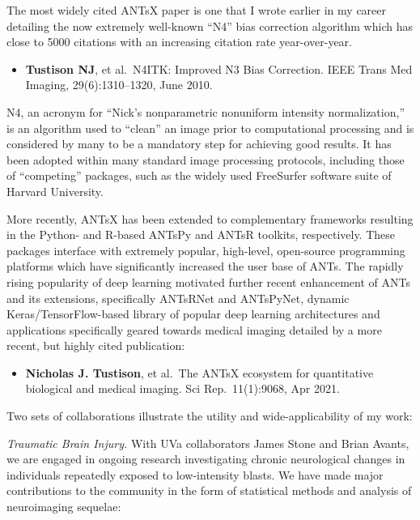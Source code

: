 \documentclass[
  11pt,
]{article}
\providecommand{\tightlist}{%
  \setlength{\itemsep}{0pt}\setlength{\parskip}{0pt}}
\begin{document}
The most widely cited ANTsX paper is one that I wrote earlier in my
career detailing the now extremely well-known ``N4'' bias correction
algorithm which has close to 5000 citations with an increasing citation
rate year-over-year.

\begin{itemize}
\tightlist
\item
  \textbf{Tustison NJ}, et al.~N4ITK: Improved N3 Bias Correction. IEEE
  Trans Med Imaging, 29(6):1310--1320, June 2010.
\end{itemize}

N4, an acronym for ``Nick's nonparametric nonuniform intensity
normalization,'' is an algorithm used to ``clean'' an image prior to
computational processing and is considered by many to be a mandatory
step for achieving good results. It has been adopted within many
standard image processing protocols, including those of ``competing''
packages, such as the widely used FreeSurfer software suite of Harvard
University.

More recently, ANTsX has been extended to complementary frameworks
resulting in the Python- and R-based ANTsPy and ANTsR toolkits,
respectively. These packages interface with extremely popular,
high-level, open-source programming platforms which have significantly
increased the user base of ANTs. The rapidly rising popularity of deep
learning motivated further recent enhancement of ANTs and its
extensions, specifically ANTsRNet and ANTsPyNet, dynamic
Keras/TensorFlow-based library of popular deep learning architectures
and applications specifically geared towards medical imaging detailed by
a more recent, but highly cited publication:

\begin{itemize}
\tightlist
\item
  \textbf{Nicholas J. Tustison}, et al.~The ANTsX ecosystem for
  quantitative biological and medical imaging. Sci Rep.~11(1):9068, Apr
  2021.
\end{itemize}

Two sets of collaborations illustrate the utility and wide-applicability
of my work:

\emph{Traumatic Brain Injury.} With UVa collaborators James Stone and
Brian Avants, we are engaged in ongoing research investigating chronic
neurological changes in individuals repeatedly exposed to low-intensity
blasts. We have made major contributions to the community in the form of
statistical methods and analysis of neuroimaging sequelae:
\end{document}
